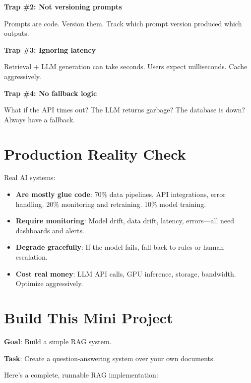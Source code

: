 \documentclass[11pt,oneside]{book}
\begin{document}
\textbf{Trap \#2: Not versioning prompts}

Prompts are code. Version them. Track which prompt version produced which outputs.

\textbf{Trap \#3: Ignoring latency}

Retrieval + LLM generation can take seconds. Users expect milliseconds. Cache aggressively.

\textbf{Trap \#4: No fallback logic}

What if the API times out? The LLM returns garbage? The database is down? Always have a fallback.

\section{Production Reality Check}

Real AI systems:

\begin{itemize}
\item \textbf{Are mostly glue code}: 70\% data pipelines, API integrations, error handling. 20\% monitoring and retraining. 10\% model training.
\item \textbf{Require monitoring}: Model drift, data drift, latency, errors---all need dashboards and alerts.
\item \textbf{Degrade gracefully}: If the model fails, fall back to rules or human escalation.
\item \textbf{Cost real money}: LLM API calls, GPU inference, storage, bandwidth. Optimize aggressively.
\end{itemize}

\section{Build This Mini Project}

\textbf{Goal}: Build a simple RAG system.

\textbf{Task}: Create a question-answering system over your own documents.

Here's a complete, runnable RAG implementation:
\end{document}
